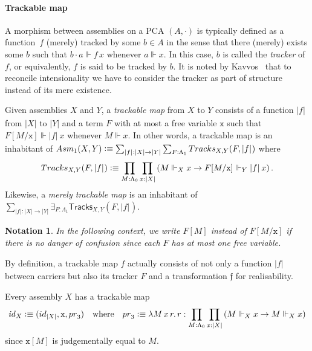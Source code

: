 \documentclass[a4paper,UKenglish,numberwithinsect,cleveref,thm-restate]{lipics-v2021}
\newcommand{\tproj}[3][]{\mathopen{}\left|#3\right|_{#2}^{#1}\mathclose{}}
\newcommand{\bproj}[1]{\tproj{}{#1}}
\newcommand{\Asm}{\mathsf{Asm}}
\newcommand{\defeq}{\vcentcolon\equiv}
\newcommand{\id}{\mathsf{id}}
\newcommand{\iid}{\mathit{id}}
\newcommand{\pr}{\mathsf{pr}}
\theoremstyle{plain}
\newtheorem*{notation*}{Notation}
\begin{document}
\paragraph*{Trackable map}%

A morphism between assemblies on a PCA $(A, \cdot)$ is typically defined as a function~$f$ (merely) tracked by some $b \in A$ in the sense that there (merely) exists some $b$ such that $b \cdot a \Vdash f\,x$ whenever $a \Vdash x$.
In this case, $b$ is called the \emph{tracker} of $f$, or equivalently, $f$ is said to be tracked by $b$.
It is noted by Kavvos~\cite{Kavvos2017b} that to reconcile intensionality we have to consider the tracker as part of structure instead of its mere existence.
\begin{definition}\label{def:trackable}
  Given assemblies $X$ and $Y$, a \emph{trackable map} from $X$ to $Y$ consists of a function $\bproj{f}$ from $|X|$ to $|Y|$ and a term $F$ with at most a free variable $\mathtt{x}$ such that $F[M/\mathtt{x}] \Vdash \bproj{f}\,x$ whenever $M \Vdash x$.
  In other words, a trackable map is an inhabitant of $\Asm_1(X, Y) \defeq \sum_{\bproj{f} : |X| \to |Y|} \sum_{F : \Lambda_1} \mathsf{Tracks}_{X, Y}(F, \bproj{f})$ where
  \[
    \mathsf{Tracks}_{X, Y}(F, \bproj{f}) \defeq \prod_{M : \Lambda_0} \prod_{x : |X|}
    \left( M \Vdash_X x \to F[M/\mathtt{x}] \Vdash_Y \bproj{f}\, x \right).
  \]
  Likewise, a \emph{merely trackable map} is an inhabitant of $\sum_{\bproj{f} : |X| \to |Y|} \exists_{F : \Lambda_1}\mathsf{Tracks}_{X, Y}(F, \bproj{f})$. 
\end{definition}

\begin{notation*}
  In the following context, we write $F[M]$ instead of $F[M/\mathtt{x}]$ if there is no danger of confusion since each $F$ has at most one free variable.
\end{notation*}
By definition, a trackable map $f$ actually consists of not only a function $\bproj{f}$ between carriers but also its tracker $F$ and a transformation $\mathfrak{f}$ for realisability.

\begin{example}[Identity]
  Every assembly $X$ has a trackable map
  \[
    \iid_X \defeq (\id_{|X|}, \mathtt{x}, \pr_3)
    \quad\text{where}\quad
  \pr_3 \defeq \lambda M\,x\,r.\, r : \prod_{M : \Lambda_0} \prod_{x : |X|} \left( M \Vdash_X x \to M  \Vdash_X x  \right)
  \]
  since $\mathtt{x}[M]$ is judgementally equal to $M$.
\end{example}
\end{document}
